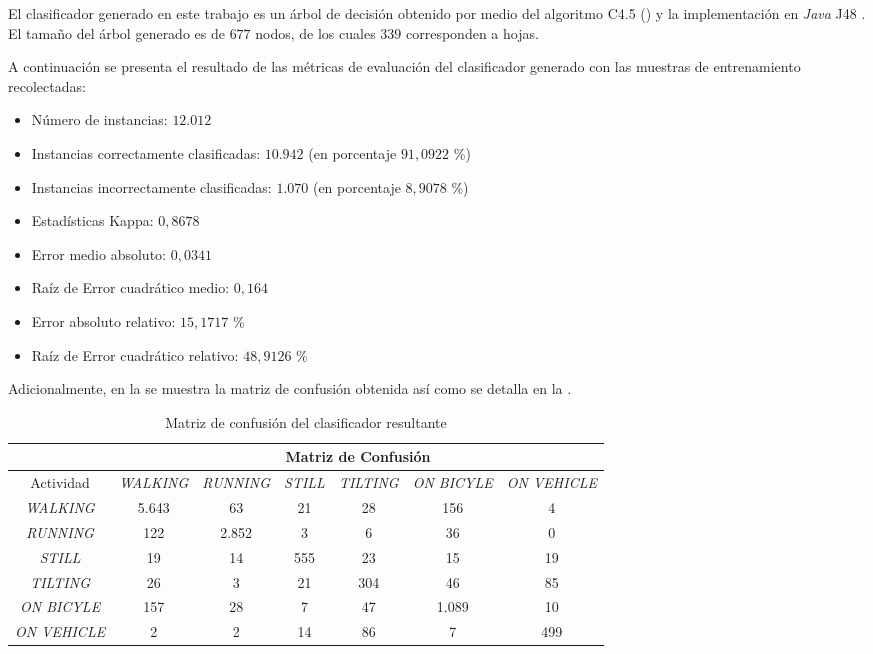 El clasificador generado en este trabajo es un árbol de decisión obtenido
por medio del algoritmo C4.5 () y la implementación
en \emph{Java} J48 \cite{Frank2016b}. El tamaño del árbol generado
es de $677$ nodos, de los cuales $339$ corresponden a hojas.

A continuación se presenta el resultado de las métricas de evaluación
del clasificador generado con las muestras de entrenamiento recolectadas: 
\begin{itemize}
\item Número de instancias: $12.012$ 
\item Instancias correctamente clasificadas: $10.942$ (en porcentaje $91,0922$
\%)
\item Instancias incorrectamente clasificadas: $1.070$ (en porcentaje $8,9078$
\%)
\item Estadísticas Kappa: $0,8678$ 
\item Error medio absoluto: $0,0341$
\item Raíz de Error cuadrático medio: $0,164$ 
\item Error absoluto relativo: $15,1717$ \% 
\item Raíz de Error cuadrático relativo: $48,9126$ \% 
\end{itemize}
Adicionalmente, en la  se muestra la
matriz de confusión obtenida así como se detalla en la . 

\begin{table}[h]
\begin{centering}
\begin{tabular}{|c|c|c|c|c|c|c|}
\cline{2-7} 
\multicolumn{1}{c|}{} & \multicolumn{6}{c|}{Matriz de Confusión}\tabularnewline
\hline 
Actividad & \emph{\footnotesize{}WALKING} & \emph{\footnotesize{}RUNNING} & \emph{\footnotesize{}STILL} & \emph{\footnotesize{}TILTING} & \emph{\footnotesize{}ON BICYLE} & \emph{\footnotesize{}ON VEHICLE}\tabularnewline
\hline 
\hline 
\emph{\footnotesize{}WALKING} & 5.643 & 63 & 21 & 28 & 156 & 4\tabularnewline
\hline 
\emph{\footnotesize{}RUNNING} & 122 & 2.852 & 3 & 6 & 36 & 0\tabularnewline
\hline 
\emph{\footnotesize{}STILL} & 19 & 14 & 555 & 23 & 15 & 19\tabularnewline
\hline 
\emph{\footnotesize{}TILTING} & 26 & 3 & 21 & 304 & 46 & 85\tabularnewline
\hline 
\emph{\footnotesize{}ON BICYLE} & 157 & 28 & 7 & 47 & 1.089 & 10\tabularnewline
\hline 
\emph{\footnotesize{}ON VEHICLE} & 2 & 2 & 14 & 86 & 7 & 499\tabularnewline
\hline 
\end{tabular}
\par\end{centering}
\caption{\label{tab6:matriz-confusion}Matriz de confusión del clasificador
resultante}
\end{table}


